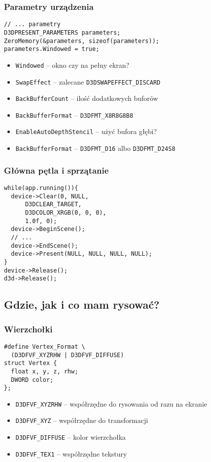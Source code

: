 \documentclass{beamer}
\begin{document}
\begin{frame}[fragile]
\frametitle{Parametry urządzenia}
\begin{lstlisting}
// ... parametry
D3DPRESENT_PARAMETERS parameters;
ZeroMemory(&parameters, sizeof(parameters));
parameters.Windowed = true;
\end{lstlisting}
\begin{itemize}
  \item \texttt{Windowed} -- okno czy na pełny ekran?
  \item \texttt{SwapEffect} -- zalecane \texttt{D3DSWAPEFFECT\_DISCARD}
  \item \texttt{BackBufferCount} -- ilość dodatkowych buforów
  \item \texttt{BackBufferFormat} -- \texttt{D3DFMT\_X8R8G8B8}
  \item \texttt{EnableAutoDepthStencil} -- użyć bufora głębi?
  \item \texttt{BackBufferFormat} -- \texttt{D3DFMT\_D16} albo \texttt{D3DFMT\_D24S8}
\end{itemize}
\end{frame}

\begin{frame}[fragile]
\frametitle{Główna pętla i sprzątanie}
\begin{lstlisting}
while(app.running()){
  device->Clear(0, NULL,
      D3DCLEAR_TARGET,
      D3DCOLOR_XRGB(0, 0, 0),
      1.0f, 0);
  device->BeginScene();
  // ...
  device->EndScene();
  device->Present(NULL, NULL, NULL, NULL);
}
device->Release();
d3d->Release();
\end{lstlisting}

\end{frame}

\subsection{Gdzie, jak i co mam rysować?}
\begin{frame}[fragile]
\frametitle{Wierzchołki}

\begin{lstlisting}
#define Vertex_Format \
  (D3DFVF_XYZRHW | D3DFVF_DIFFUSE)
struct Vertex {
  float x, y, z, rhw;
  DWORD color;
};
\end{lstlisting}

\begin{itemize}
  \item \texttt{D3DFVF\_XYZRHW} -- współrzędne do rysowania od razu na ekranie
  \item \texttt{D3DFVF\_XYZ} -- współrzędne do transformacji
  \item \texttt{D3DFVF\_DIFFUSE} -- kolor wierzchołka
  \item \texttt{D3DFVF\_TEX1} -- współrzędne tekstury
\end{itemize}

\end{frame}
\end{document}
